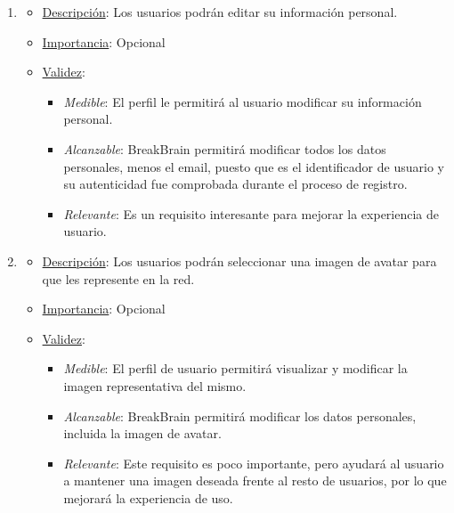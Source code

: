 \begin{enumerate}
\item %
  \begin{itemize}
  \item \underline{Descripción}: Los usuarios podrán editar su información personal.
  \item \underline{Importancia}: Opcional
  \item \underline{Validez}:
    \begin{itemize}
    \item \textit{Medible}: El perfil le permitirá al usuario modificar su información personal.
    \item \textit{Alcanzable}: BreakBrain permitirá modificar todos los datos personales, menos el email, puesto que es el identificador de usuario y su autenticidad fue comprobada durante el proceso de registro.
    \item \textit{Relevante}: Es un requisito interesante para mejorar la experiencia de usuario.
    \end{itemize}
  \end{itemize}

\item %
  \begin{itemize}
  \item \underline{Descripción}: Los usuarios podrán seleccionar una imagen de avatar para que les represente en la red.
  \item \underline{Importancia}: Opcional
  \item \underline{Validez}:
    \begin{itemize}
    \item \textit{Medible}: El perfil de usuario permitirá visualizar y modificar la imagen representativa del mismo.
    \item \textit{Alcanzable}: BreakBrain permitirá modificar los datos personales, incluida la imagen de avatar.
    \item \textit{Relevante}: Este requisito es poco importante, pero ayudará al usuario a mantener una imagen deseada frente al resto de usuarios, por lo que mejorará la experiencia de uso.
    \end{itemize}
  \end{itemize}


\end{enumerate}
